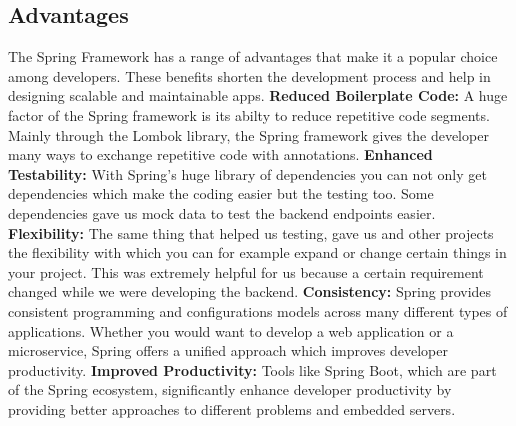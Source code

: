     \subsection{Advantages}
    The Spring Framework has a range of advantages that make it a popular choice among developers. These benefits shorten the development process and help in designing scalable and maintainable apps. \newline \newline
    \textbf{Reduced Boilerplate Code:} \newline 
    A huge factor of the Spring framework is its abilty to reduce repetitive code segments. Mainly through the Lombok library, the Spring framework gives the developer many ways to exchange repetitive code with annotations. \newline  \newline
    \textbf{Enhanced Testability:} \newline
    With Spring's huge library of dependencies you can not only get dependencies which make the coding easier but the testing too. Some dependencies gave us mock data to test the backend endpoints easier.\newline \newline
    \textbf{Flexibility:} \newline
    The same thing that helped us testing, gave us and other projects the flexibility with which you can for example expand or change certain things in your project. This was extremely helpful for us because a certain requirement changed while we were developing the backend.\newline \newline
    \textbf{Consistency:} \newline
    Spring provides consistent programming and configurations models across many different types of applications. Whether you would want to develop a web application or a microservice, Spring offers a unified approach which improves developer productivity.\newline \newline
    \textbf{Improved Productivity:} \newline
    Tools like Spring Boot, which are part of the Spring ecosystem, significantly enhance developer productivity by providing better approaches to different problems and embedded servers.\newline 
    